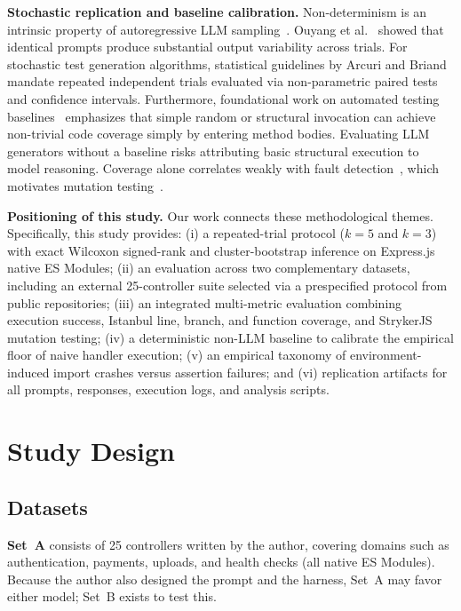 \documentclass[11pt]{article}
\begin{document}
\textbf{Stochastic replication and baseline calibration.}
Non-determinism is an intrinsic property of autoregressive LLM sampling~\cite{ouyang2023nondeterminism}. Ouyang et al.~\cite{ouyang2023nondeterminism} showed that identical prompts produce substantial output variability across trials. For stochastic test generation algorithms, statistical guidelines by Arcuri and Briand~\cite{arcuri2014hitchhiker} mandate repeated independent trials evaluated via non-parametric paired tests and confidence intervals. Furthermore, foundational work on automated testing baselines~\cite{arcuri2010random} emphasizes that simple random or structural invocation can achieve non-trivial code coverage simply by entering method bodies. Evaluating LLM generators without a baseline risks attributing basic structural execution to model reasoning. Coverage alone correlates weakly with fault detection~\cite{inozemtseva2014coverage}, which motivates mutation testing~\cite{jia2011mutation}.

\textbf{Positioning of this study.}
Our work connects these methodological themes. Specifically, this study provides:
(i) a repeated-trial protocol ($k=5$ and $k=3$) with exact Wilcoxon signed-rank and cluster-bootstrap inference on Express.js native ES Modules;
(ii) an evaluation across two complementary datasets, including an external 25-controller suite selected via a prespecified protocol from public repositories;
(iii) an integrated multi-metric evaluation combining execution success, Istanbul line, branch, and function coverage, and StrykerJS mutation testing;
(iv) a deterministic non-LLM baseline to calibrate the empirical floor of naive handler execution;
(v) an empirical taxonomy of environment-induced import crashes versus assertion failures; and
(vi) replication artifacts for all prompts, responses, execution logs, and analysis scripts.

\section{Study Design}
\subsection{Datasets}
\textbf{Set~A} consists of 25 controllers written by the author, covering domains such as authentication, payments, uploads, and health checks (all native ES Modules). Because the author also designed the prompt and the harness, Set~A may favor either model; Set~B exists to test this.
\end{document}
